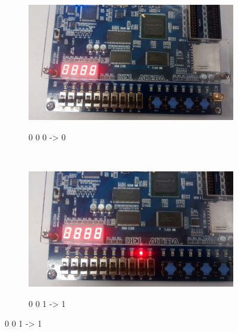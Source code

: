 \begin{figure}
    \centering

    \begin{subfigure}[b]{0.44\textwidth}
        \includegraphics[width=\textwidth]{img/cenario2/circ1}
        \label{fig:circ1}
		\caption{0 0 0 -> 0}
    \end{subfigure}
    ~
    \begin{subfigure}[b]{0.44\textwidth}
        \includegraphics[width=\textwidth]{img/cenario2/circ2}
        \label{fig:circ2}
		\caption{0 0 1 -> 1}
    \end{subfigure}



\end{figure}
